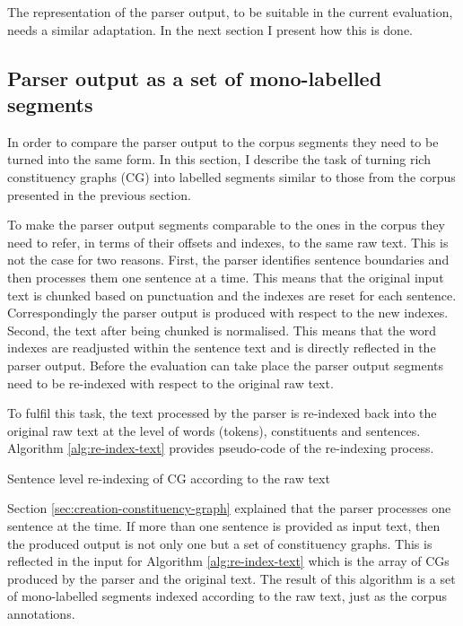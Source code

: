     The representation of the parser output, to be suitable in the current evaluation, needs a similar adaptation. In the next section I present how this is done. 

\subsection{Parser output as a set of mono-labelled segments}
    
    In order to compare the parser output to the corpus segments they need to be turned into the same form. In this section, I describe the task of turning rich constituency graphs (CG) into labelled segments similar to those from the corpus presented in the previous section. 
    
    To make the parser output segments comparable to the ones in the corpus they need to refer, in terms of their offsets and indexes, to the same raw text. This is not the case for two reasons. First, the parser identifies sentence boundaries and then processes them one sentence at a time. This means that the original input text is chunked based on punctuation and the indexes are reset for each sentence. Correspondingly the parser output is produced with respect to the new indexes. Second, the text after being chunked is normalised. This means that the word indexes are readjusted within the sentence text and is directly reflected in the parser output. Before the evaluation can take place the parser output segments need to be re-indexed with respect to the original raw text. 
    
    To fulfil this task, the text processed by the parser is re-indexed back into the original raw text at the level of words (tokens), constituents and sentences. Algorithm \ref{alg:re-index-text} provides pseudo-code of the re-indexing process.
     
    \begin{algorithm}[!ht]
        \caption{Sentence level re-indexing of CG according to the raw text}
        \label{alg:re-index-text}
    \end{algorithm}

    Section \ref{sec:creation-constituency-graph} explained that the parser processes one sentence at the time. If more than one sentence is provided as input text, then the produced output is not only one but a set of constituency graphs. This is reflected in the input for Algorithm \ref{alg:re-index-text} which is the array of CGs produced by the parser and the original text. The result of this algorithm is a set of mono-labelled segments indexed according to the raw text, just as the corpus annotations. 
    
